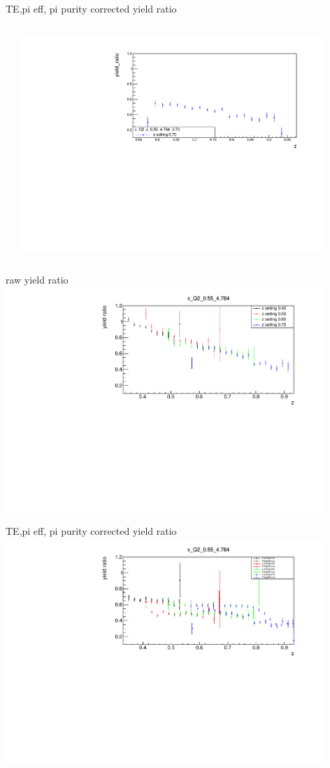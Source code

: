 \begin{frame}{TE,pi eff, pi purity corrected yield ratio}
\begin{columns}
\begin{column}[T]{0.5\textwidth}
\end{column}
\begin{column}[T]{0.5\textwidth}
\includegraphics[width = 0.9\textwidth]{results/yield/statistics_corr/x_Q2_z_0.55_4.764_0.70_ratio.pdf}
\end{column}
\end{columns}
\end{frame}
\begin{frame}{raw yield ratio}
\includegraphics[width = 0.9\textwidth]{results/yield/statistics/x_Q2_0.55_4.764_ratio.pdf}
\end{frame}
\begin{frame}{TE,pi eff, pi purity corrected yield ratio}
\includegraphics[width = 0.9\textwidth]{results/yield/statistics_corr/x_Q2_0.55_4.764_ratio.pdf}
\end{frame}
